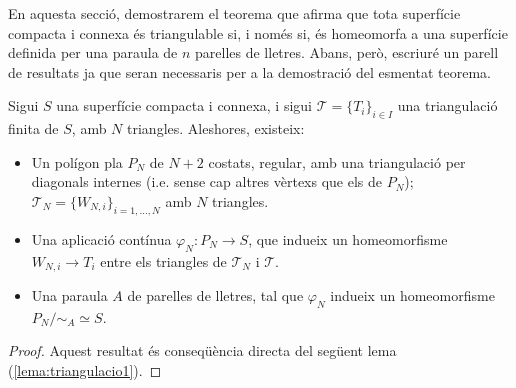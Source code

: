 \documentclass[../main.tex]{subfiles}
\begin{document}
En aquesta secció, demostrarem el teorema que afirma que tota superfície compacta i connexa és triangulable si, i només si, és homeomorfa a una superfície definida per una paraula de $n$ parelles de lletres. Abans, però, escriuré un parell de resultats ja que seran necessaris per a la demostració del esmentat teorema.

\begin{prop}
\label{prop:triangulacio1} Sigui $S$ una superfície compacta i connexa, i sigui $\mathcal{T} = \{T_i\}_{i\in I}$ una triangulació finita de $S$, amb $N$ triangles. Aleshores, existeix:
\begin{itemize}
    \item Un polígon pla $P_N$ de $N+2$ costats, regular, amb una triangulació per diagonals internes (i.e. sense cap altres vèrtexs que els de $P_N$); $\mathcal{T}_N=\{W_{N,i}\}_{i=1,\ldots,N}$ amb $N$ triangles.
    \item Una aplicació contínua $\varphi_N:P_N\rightarrow S$, que indueix un homeomorfisme $W_{N,i}\rightarrow T_i$ entre els triangles de $\mathcal{T}_N$ i $\mathcal{T}$.
    \item Una paraula $A$ de parelles de lletres, tal que $\varphi_N$ indueix un homeomorfisme $P_N/\sim_A\simeq S$.
\end{itemize}
\end{prop}
\begin{proof}
Aquest resultat és conseqüència directa del següent lema (\ref{lema:triangulacio1}).
\end{proof}
\end{document}
